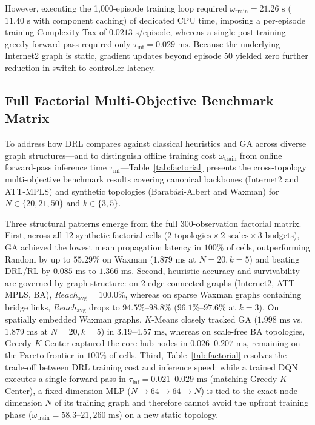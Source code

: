 \documentclass[conference]{IEEEtran}
\begin{document}
However, executing the 1,000-episode training loop required $\omega_{\text{train}} = 21.26\text{ s}$ ($11.40\text{ s}$ with component caching) of dedicated CPU time, imposing a per-episode training Complexity Tax of $0.0213\text{ s/episode}$, whereas a single post-training greedy forward pass required only $\tau_{\text{inf}} = 0.029\text{ ms}$. Because the underlying Internet2 graph is static, gradient updates beyond episode 50 yielded zero further reduction in switch-to-controller latency.

\subsection{Full Factorial Multi-Objective Benchmark Matrix}
To address how DRL compares against classical heuristics and GA across diverse graph structures---and to distinguish offline training cost $\omega_{\text{train}}$ from online forward-pass inference time $\tau_{\text{inf}}$---Table~\ref{tab:factorial} presents the cross-topology multi-objective benchmark results covering canonical backbones (Internet2 and ATT-MPLS) and synthetic topologies (Barab\'{a}si-Albert and Waxman) for $N \in \{20, 21, 50\}$ and $k \in \{3, 5\}$.

Three structural patterns emerge from the full 300-observation factorial matrix. First, across all 12 synthetic factorial cells ($2 \text{ topologies} \times 2 \text{ scales} \times 3 \text{ budgets}$), GA achieved the lowest mean propagation latency in $100\%$ of cells, outperforming Random by up to $55.29\%$ on Waxman ($1.879\text{ ms}$ at $N=20, k=5$) and beating DRL/RL by $0.085\text{ ms}$ to $1.366\text{ ms}$. Second, heuristic accuracy and survivability are governed by graph structure: on 2-edge-connected graphs (Internet2, ATT-MPLS, BA), $Reach_{\text{avg}} = 100.0\%$, whereas on sparse Waxman graphs containing bridge links, $Reach_{\text{avg}}$ drops to $94.5\%\text{--}98.8\%$ ($96.1\%\text{--}97.6\%$ at $k=3$). On spatially embedded Waxman graphs, $K$-Means closely tracked GA ($1.998\text{ ms}$ vs.\ $1.879\text{ ms}$ at $N=20, k=5$) in $3.19\text{--}4.57\text{ ms}$, whereas on scale-free BA topologies, Greedy $K$-Center captured the core hub nodes in $0.026\text{--}0.207\text{ ms}$, remaining on the Pareto frontier in $100\%$ of cells. Third, Table~\ref{tab:factorial} resolves the trade-off between DRL training cost and inference speed: while a trained DQN executes a single forward pass in $\tau_{\text{inf}} = 0.021\text{--}0.029\text{ ms}$ (matching Greedy $K$-Center), a fixed-dimension MLP ($N \to 64 \to 64 \to N$) is tied to the exact node dimension $N$ of its training graph and therefore cannot avoid the upfront training phase ($\omega_{\text{train}} = 58.3\text{--}21{,}260\text{ ms}$) on a new static topology.
\end{document}
